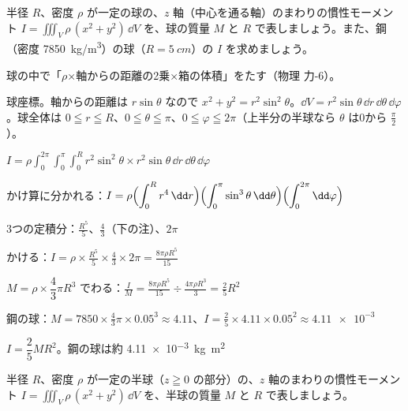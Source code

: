 \begin{reidai}[球の慣性モーメント]
半径 $R$、密度 $\rho$ が一定の球の、$z$ 軸（中心を通る軸）のまわりの慣性モーメント $I=\iiint_V\rho\,(x^2+y^2)\,\dd V$ を、球の質量 $M$ と $R$ で表しましょう。また、鋼（密度 \qty{7850}{kg/m^3}）の球（$R=\qty{5}{cm}$）の $I$ を求めましょう。\par
\kangaekata {}\par
{}\enspace 球の中で「$\rho$×軸からの距離の2乗×箱の体積」をたす（物理 力-6）。\par
{}\enspace 球座標。軸からの距離は $r\sin\theta$ なので $x^2+y^2=r^2\sin^2\theta$。$\dd V=r^2\sin\theta\,\dd r\,\dd\theta\,\dd\varphi$。球全体は $0\leqq r\leqq R$、$0\leqq\theta\leqq\pi$、$0\leqq\varphi\leqq2\pi$（上半分の半球なら $\theta$ は0から $\frac{\pi}{2}$）。\par
\shiki\kviiigs{}\zw{} $\displaystyle I=\rho\int_0^{2\pi}\!\!\int_0^{\pi}\!\!\int_0^R r^2\sin^2\theta\times r^2\sin\theta\,\dd r\,\dd\theta\,\dd\varphi$\par
\kviiiga かけ算に分かれる：$\displaystyle I=\rho\Bigl(\int_0^R r^4\,\dd r\Bigr)\Bigl(\int_0^{\pi}\sin^3\theta\,\dd\theta\Bigr)\Bigl(\int_0^{2\pi}\dd\varphi\Bigr)$\par
\kviiiga 3つの定積分：$\displaystyle \frac{R^5}{5}$、$\displaystyle \frac{4}{3}$（下の注）、$2\pi$\par
\kviiiga かける：$\displaystyle I=\rho\times\frac{R^5}{5}\times\frac{4}{3}\times2\pi=\frac{8\pi\rho R^5}{15}$\par
\kviiiga $M=\rho\times\dfrac43\pi R^3$ でわる：$\displaystyle \frac{I}{M}=\frac{8\pi\rho R^5}{15}\div\frac{4\pi\rho R^3}{3}=\frac{2}{5}R^2$\par
\kviiiga 鋼の球：$\displaystyle M=7850\times\frac{4}{3}\pi\times0.05^3\approx4.11$、$\displaystyle I=\frac{2}{5}\times4.11\times0.05^2\approx\num{4.11e-3}$\par
\kotae $I=\dfrac{2}{5}MR^2$。鋼の球は約 \qty{4.11e-3}{kg.m^2}\par
{}
\end{reidai}

\begin{jibun}
半径 $R$、密度 $\rho$ が一定の半球（$z\geqq0$ の部分）の、$z$ 軸のまわりの慣性モーメント $I=\iiint_V\rho\,(x^2+y^2)\,\dd V$ を、半球の質量 $M$ と $R$ で表しましょう。
\end{jibun}

